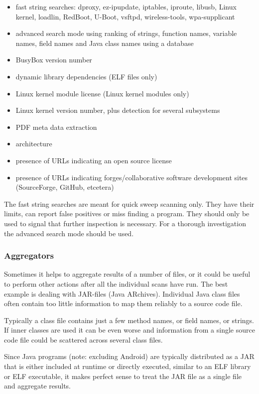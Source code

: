 \documentclass[10pt]{article}
\begin{document}
\begin{itemize}
\item fast string searches: dproxy, ez-ipupdate, iptables, iproute, libusb,
Linux kernel, loadlin, RedBoot, U-Boot, vsftpd, wireless-tools, wpa-supplicant
\item advanced search mode using ranking of strings, function names, variable
names, field names and Java class names using a database
\item BusyBox version number
\item dynamic library dependencies (ELF files only)
\item Linux kernel module license (Linux kernel modules only)
\item Linux kernel version number, plus detection for several subsystems
\item PDF meta data extraction
\item architecture
\item presence of URLs indicating an open source license
\item presence of URLs indicating forges/collaborative software development
sites (SourceForge, GitHub, etcetera)
\end{itemize}

The fast string searches are meant for quick sweep scanning only. They have
their limits, can report false positives or miss finding a program. They should
only be used to signal that further inspection is necessary. For a thorough
investigation the advanced search mode should be used.

\subsubsection{Aggregators}

Sometimes it helps to aggregate results of a number of files, or it could be
useful to perform other actions after all the individual scans have run. The
best example is dealing with JAR-files (Java ARchives). Individual Java class
files often contain too little information to map them reliably to a source
code file.

Typically a class file contains just a few method names, or field names, or
strings. If inner classes are used it can be even worse and information from a
single source code file could be scattered across several class files.

Since Java programs (note: excluding Android) are typically distributed as a
JAR that is either included at runtime or directly executed, similar to an ELF
library or ELF executable, it makes perfect sense to treat the JAR file as a
single file and aggregate results.
\end{document}
